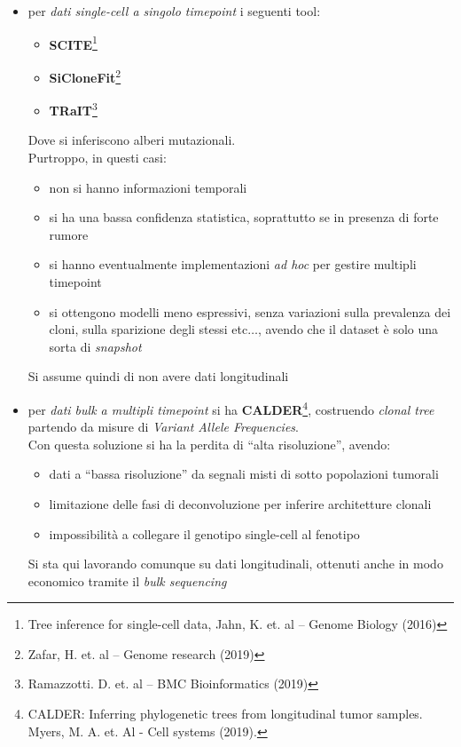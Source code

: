 \documentclass[a4paper,12pt, oneside]{book}
\begin{document}
\begin{itemize}
  \item per \textit{dati single-cell a singolo timepoint} i seguenti tool:
  \begin{itemize}
    \item \textbf{SCITE}\footnote{Tree inference for single-cell data, Jahn,
      K. et. al – Genome Biology (2016)} 
    \item \textbf{SiCloneFit}\footnote{Zafar, H. et. al – Genome research
      (2019)} 
    \item \textbf{TRaIT}\footnote{Ramazzotti. D. et. al – BMC Bioinformatics
      (2019)} 
  \end{itemize}
  Dove si inferiscono alberi mutazionali.\\
  Purtroppo, in questi casi:
  \begin{itemize}
    \item non si hanno informazioni temporali
    \item si ha una bassa confidenza statistica, soprattutto se in presenza di
    forte rumore
    \item si hanno eventualmente implementazioni \textit{ad hoc} per gestire
    multipli timepoint
    \item si ottengono modelli meno espressivi, senza variazioni sulla
    prevalenza dei cloni, sulla sparizione degli stessi etc$\ldots$, avendo che
    il dataset è solo una sorta di \textit{snapshot}
  \end{itemize}
  Si assume quindi di non avere dati longitudinali
  \item per \textit{dati bulk a multipli timepoint} si ha
  \textbf{CALDER}\footnote{CALDER: Inferring phylogenetic trees from
    longitudinal tumor samples. Myers, M. A. et. Al - Cell systems (2019).},
  costruendo \textit{clonal tree} partendo da misure di \textit{Variant Allele
    Frequencies}.\\ 
  Con questa soluzione si ha la perdita di ``alta risoluzione'', avendo:
  \begin{itemize}
    \item dati a ``bassa risoluzione'' da segnali misti di sotto popolazioni
    tumorali
    \item limitazione delle fasi di deconvoluzione per inferire architetture
    clonali 
    \item impossibilità a collegare il genotipo single-cell al fenotipo 
  \end{itemize}
  Si sta qui lavorando comunque su dati longitudinali, ottenuti anche in modo
  economico tramite il \textit{bulk sequencing}  
\end{itemize}
\end{document}
